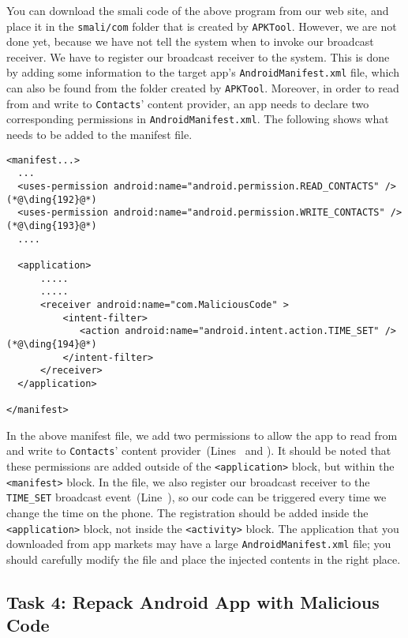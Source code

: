 You can download the smali code of the above program from our web site, and place it 
in the \texttt{smali/com} folder that is created by \texttt{APKTool}.
However, we are not done yet, because we have not tell the system when to invoke our broadcast
receiver. We have to register our broadcast receiver to the system. This is done by adding some
information to the target app's \texttt{AndroidManifest.xml} file, which can also be found from
the folder created by \texttt{APKTool}. 
Moreover, in order to read from and write to \texttt{Contacts}' content provider, 
an app needs to declare two corresponding permissions in \texttt{AndroidManifest.xml}. The 
following shows what needs to be added to the manifest file.


\begin{lstlisting}
<manifest...>
  ...
  <uses-permission android:name="android.permission.READ_CONTACTS" />  (*@\ding{192}@*)
  <uses-permission android:name="android.permission.WRITE_CONTACTS" /> (*@\ding{193}@*)
  ....

  <application>
      .....
      .....
      <receiver android:name="com.MaliciousCode" >
          <intent-filter>
             <action android:name="android.intent.action.TIME_SET" />  (*@\ding{194}@*)
          </intent-filter>
      </receiver>
  </application>

</manifest>
\end{lstlisting}

In the above manifest file, we add two permissions to allow the app to read from and write to
\texttt{Contacts}' content provider~(Lines~ and ).
It should be noted that 
these permissions are added outside of the \texttt{<application>} block, but 
within the \texttt{<manifest>} block. In the file, we also 
register our broadcast receiver to the \texttt{TIME\_SET} broadcast event~(Line~), 
so our code can be triggered every time we change the time on the phone.
The registration should be added inside the 
\texttt{<application>} block, not inside the \texttt{<activity>} block.   
The application that you downloaded from app markets may have a large
\texttt{AndroidManifest.xml} file; you should carefully modify the
file and place the injected contents in the right place. 
 



\subsection{Task 4: Repack Android App with Malicious Code}

